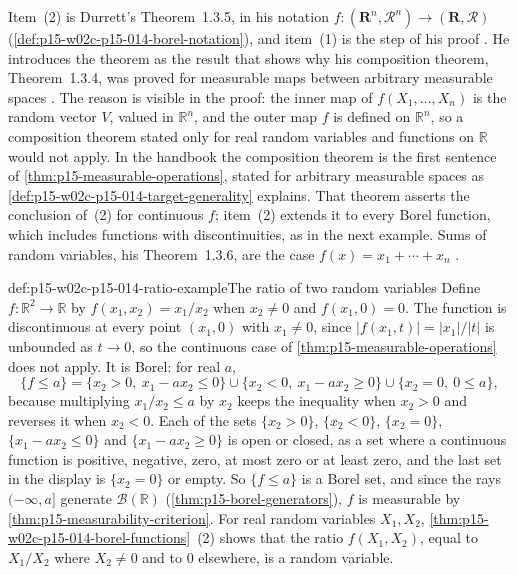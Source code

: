 Item~(2) is Durrett's Theorem~1.3.5, in his notation
\(f:(\mathbf R^n,\mathcal R^n)\to(\mathbf R,\mathcal R)\)
(\cref{def:p15-w02c-p15-014-borel-notation}), and item~(1) is the step of
his proof \cite[Theorem~1.3.5, p.~16]{DurrettPTEAuthor2019}. He
introduces the theorem as the result that shows why his composition
theorem, Theorem~1.3.4, was proved for measurable maps between arbitrary
measurable spaces \cite[p.~16]{DurrettPTEAuthor2019}. The reason is
visible in the proof: the inner map of \(f(X_1,\ldots,X_n)\) is the
random vector \(V\), valued in \(\mathbb R^n\), and the outer map \(f\)
is defined on \(\mathbb R^n\), so a composition theorem stated only for
real random variables and functions on \(\mathbb R\) would not apply.
In the handbook the composition theorem is the first sentence of
\cref{thm:p15-measurable-operations}, stated for arbitrary measurable
spaces as \cref{def:p15-w02c-p15-014-target-generality} explains. That
theorem asserts the conclusion of~(2) for continuous \(f\); item~(2)
extends it to every Borel function, which includes functions with
discontinuities, as in the next example. Sums of random variables, his
Theorem~1.3.6, are the case \(f(x)=x_1+\cdots+x_n\)
\cite[Theorem~1.3.6, p.~16]{DurrettPTEAuthor2019}.

\begin{hbexample}{def:p15-w02c-p15-014-ratio-example}{The ratio of two random variables}
Define \(f:\mathbb R^2\to\mathbb R\) by \(f(x_1,x_2)=x_1/x_2\) when
\(x_2\neq0\) and \(f(x_1,0)=0\). The function is discontinuous at every
point \((x_1,0)\) with \(x_1\neq0\), since \(|f(x_1,t)|=|x_1|/|t|\) is
unbounded as \(t\to0\), so the continuous case of
\cref{thm:p15-measurable-operations} does not apply. It is Borel: for
real \(a\),
\[
 \{f\leq a\}
 =\{x_2>0,\ x_1-ax_2\leq0\}\cup\{x_2<0,\ x_1-ax_2\geq0\}
  \cup\{x_2=0,\ 0\leq a\},
\]
because multiplying \(x_1/x_2\leq a\) by \(x_2\) keeps the inequality
when \(x_2>0\) and reverses it when \(x_2<0\). Each of the sets
\(\{x_2>0\}\), \(\{x_2<0\}\), \(\{x_2=0\}\), \(\{x_1-ax_2\leq0\}\) and
\(\{x_1-ax_2\geq0\}\) is open or closed, as a set where a continuous
function is positive, negative, zero, at most zero or at least zero,
and the last set in the display is \(\{x_2=0\}\) or empty. So
\(\{f\leq a\}\) is a Borel set, and since the rays \((-\infty,a]\)
generate \(\mathcal B(\mathbb R)\) (\cref{thm:p15-borel-generators}),
\(f\) is measurable by \cref{thm:p15-measurability-criterion}. For real
random variables \(X_1,X_2\),
\cref{thm:p15-w02c-p15-014-borel-functions}~(2) shows that the ratio
\(f(X_1,X_2)\), equal to \(X_1/X_2\) where \(X_2\neq0\) and to 0
elsewhere, is a random variable.
\end{hbexample}

